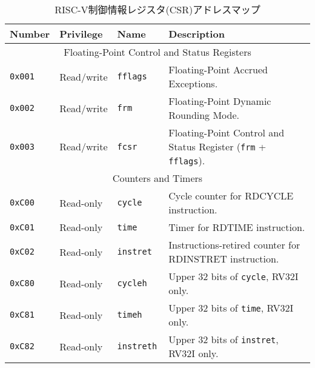\begin{table}[htb!]
\begin{center}
\begin{tabular}{|l|l|l|l|}
\hline
Number    & Privilege & Name & Description \\
\hline
\multicolumn{4}{|c|}{Floating-Point Control and Status Registers} \\
\hline
\tt 0x001 & Read/write  &\tt fflags     & Floating-Point Accrued Exceptions. \\
\tt 0x002 & Read/write  &\tt frm        & Floating-Point Dynamic Rounding Mode. \\
\tt 0x003 & Read/write  &\tt fcsr       & Floating-Point Control and Status
Register ({\tt frm} + {\tt fflags}). \\
\hline
\multicolumn{4}{|c|}{Counters and Timers} \\
\hline
\tt 0xC00 & Read-only  &\tt cycle      & Cycle counter for RDCYCLE instruction. \\
\tt 0xC01 & Read-only  &\tt time       & Timer for RDTIME instruction. \\
\tt 0xC02 & Read-only  &\tt instret    & Instructions-retired counter for RDINSTRET instruction. \\
\tt 0xC80 & Read-only  &\tt cycleh     & Upper 32 bits of {\tt cycle}, RV32I only. \\
\tt 0xC81 & Read-only  &\tt timeh      & Upper 32 bits of {\tt time}, RV32I only. \\
\tt 0xC82 & Read-only  &\tt instreth   & Upper 32 bits of {\tt instret}, RV32I only. \\
\hline
\end{tabular}
\end{center}
\begin{comment}
\caption{RISC-V control and status register (CSR) address map.}
\end{comment}
\caption{RISC-V制御情報レジスタ(CSR)アドレスマップ}
\label{rvgcsrnames}
\end{table}
